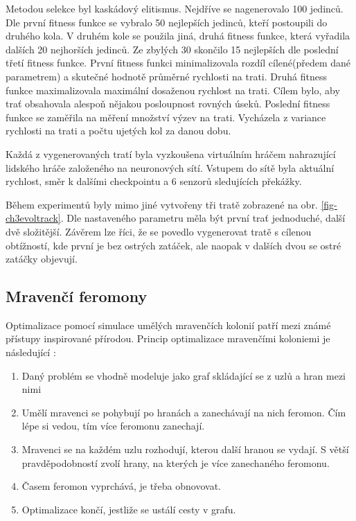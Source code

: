 Metodou selekce byl kaskádový elitismus. Nejdříve se nagenerovalo 100 jedinců. Dle první fitness funkce se vybralo 50 nejlepších jedinců, kteří postoupili do druhého kola. V druhém kole se použila jiná, druhá fitness funkce, která vyřadila dalších 20 nejhorších jedinců. Ze zbylých 30 skončilo 15 nejlepších dle poslední třetí fitness funkce. První fitness funkci minimalizovala rozdíl cílené(předem dané parametrem) a skutečné hodnotě průměrné rychlosti na trati. Druhá fitness funkce maximalizovala maximální dosaženou rychlost na trati. Cílem bylo, aby trať obsahovala alespoň nějakou posloupnost rovných úseků. Poslední fitness funkce se zaměřila na měření množství výzev na trati. Vycházela z variance rychlosti na trati a počtu ujetých kol za danou dobu. 

Každá z vygenerovaných tratí byla vyzkoušena virtuálním hráčem nahrazující lidského hráče založeného na neuronových sítí. Vstupem do sítě byla aktuální rychlost, směr k dalšími checkpointu a 6 senzorů sledujících překážky.

Během experimentů byly mimo jiné vytvořeny tři tratě zobrazené na obr. \ref{fig-ch3evoltrack}. Dle nastaveného parametru měla být první trať jednoduché, další dvě složitější. Závěrem lze říci, že se povedlo vygenerovat tratě s cílenou obtížností, kde první je bez ostrých zatáček, ale naopak v dalších dvou se ostré zatáčky objevují.

\subsection{Mravenčí feromony} \label{sec:ants}

Optimalizace pomocí simulace umělých mravenčích kolonií patří mezi známé přístupy inspirované přírodou. Princip optimalizace mravenčími koloniemi je následující :

\begin{enumerate}
	\item Daný problém se vhodně modeluje jako graf skládající se z uzlů a hran mezi nimi
	\item Umělí mravenci se pohybují po hranách a zanechávají na nich feromon. Čím lépe si vedou, tím více feromonu zanechají.
	\item Mravenci se na každém uzlu rozhodují, kterou další hranou se vydají. S větší pravděpodobností zvolí hrany, na kterých je více zanechaného feromonu.
	\item Časem feromon vyprchává, je třeba obnovovat.
	\item Optimalizace končí, jestliže se ustálí cesty v grafu. 
\end{enumerate}

